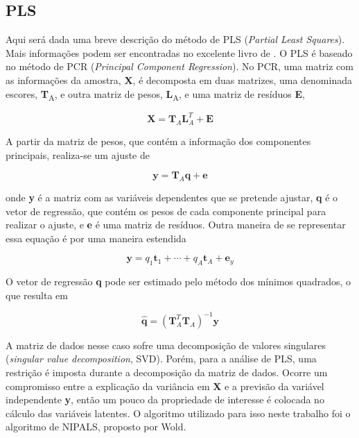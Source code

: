 		\subsection{PLS} 
		
		Aqui será dada uma breve descrição do método de PLS (\emph{Partial Least Squares}). Mais informações podem ser encontradas no excelente livro de \citeauthor{MarciaQuimiometria}. O PLS é baseado no método de PCR (\emph{Principal Component Regression}). No PCR, uma matriz com as informações da amostra, \textbf{X}, é decomposta em duas matrizes, uma denominada escores, \textbf{T}\textsubscript{A}, e outra matriz de pesos, \textbf{L}\textsubscript{A}, e uma matriz de resíduos \textbf{E},
		
		\begin{equation}
			\mathbf{X} = \mathbf{T}_A \mathbf{L}_A^T + \mathbf{E}
			\label{eqn:decomp_PCR}
		\end{equation}
		
		A partir da matriz de pesos, que contém a informação dos componentes principais, realiza-se um ajuste de \cite{MarciaQuimiometria}
		
		\begin{equation}
			\mathbf{y} = \mathbf{T}_A\mathbf{q} + \mathbf{e}
			\label{eqn:modelo_PCR}
		\end{equation}
		
		\noindent onde \textbf{y} é a matriz com as variáveis dependentes que se pretende ajustar, \textbf{q} é o vetor de regressão, que contém os pesos de cada componente principal para realizar o ajuste, e \textbf{e} é uma matriz de resíduos. Outra maneira de se representar essa equação é por uma maneira estendida
		
		\begin{equation}
			\mathbf{y} = q_1\mathbf{t}_1 + \cdots + q_A\mathbf{t}_A + \mathbf{e}_y
			\label{eqn:modelo_PCR_estendido}
		\end{equation}
		
		O vetor de regressão \textbf{q} pode ser estimado pelo método dos mínimos quadrados, o que resulta em
		
		\begin{equation}
			\hat{\textbf{q}} = \left(  \mathbf{T}_A^T \mathbf{T}_A  \right)^{-1}\mathbf{y}
			\label{eqn:estimativa_regress_q}
		\end{equation}

		A matriz de dados nesse caso sofre uma decomposição de valores singulares (\emph{singular value decomposition}, SVD). Porém, para a análise de PLS, uma restrição é imposta durante a decomposição da matriz de dados. Ocorre um compromisso entre a explicação da variância em \textbf{X} e a previsão da variável independente \textbf{y}, então um pouco da propriedade de interesse é colocada no cálculo das variáveis latentes. O algoritmo utilizado para isso neste trabalho foi o algoritmo de NIPALS, proposto por Wold.
		
